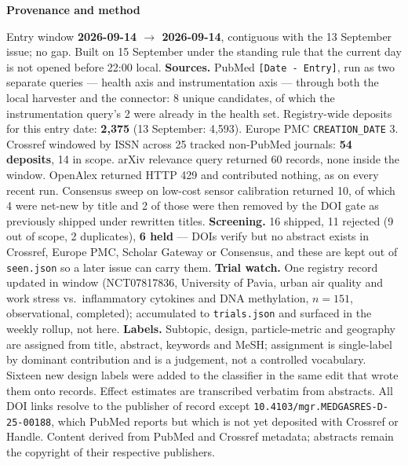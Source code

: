\documentclass[10pt]{article}
\begin{document}
\vspace{4mm}
\begin{keybox}
{\sffamily\bfseries\footnotesize\color{Deep}Provenance and method}\\[1.2mm]
{\fontsize{7.2}{8.8}\selectfont
Entry window \textbf{2026-09-14 $\to$ 2026-09-14}, contiguous with the 13 September issue;
no gap. Built on 15 September under the standing rule that the current day is not opened
before 22:00 local.
\textbf{Sources.} PubMed \texttt{[Date - Entry]}, run as two separate queries --- health
axis and instrumentation axis --- through both the local harvester and the connector:
8 unique candidates, of which the instrumentation query's 2 were already in the health
set. Registry-wide deposits for this entry date: \textbf{2{,}375} (13 September: 4{,}593).
Europe PMC \texttt{CREATION\_DATE} 3. Crossref windowed by ISSN across 25 tracked
non-PubMed journals: \textbf{54 deposits}, 14 in scope. arXiv relevance query returned
60 records, none inside the window. OpenAlex returned HTTP 429 and contributed nothing,
as on every recent run. Consensus sweep on low-cost sensor calibration returned 10,
of which 4 were net-new by title and 2 of those were then removed by the DOI gate as
previously shipped under rewritten titles.
\textbf{Screening.} 16 shipped, 11 rejected (9 out of scope, 2 duplicates), \textbf{6 held}
--- DOIs verify but no abstract exists in Crossref, Europe PMC, Scholar Gateway or
Consensus, and these are kept out of \texttt{seen.json} so a later issue can carry them.
\textbf{Trial watch.} One registry record updated in window (NCT07817836, University of
Pavia, urban air quality and work stress vs.\ inflammatory cytokines and DNA methylation,
$n=151$, observational, completed); accumulated to \texttt{trials.json} and surfaced in the
weekly rollup, not here.
\textbf{Labels.} Subtopic, design, particle-metric and geography are assigned from title,
abstract, keywords and MeSH; assignment is single-label by dominant contribution and is a
judgement, not a controlled vocabulary. Sixteen new design labels were added to the
classifier in the same edit that wrote them onto records.
Effect estimates are transcribed verbatim from abstracts. All DOI links resolve to the
publisher of record except \texttt{10.4103/mgr.MEDGASRES-D-25-00188}, which PubMed
reports but which is not yet deposited with Crossref or Handle.
Content derived from PubMed and Crossref metadata; abstracts remain the copyright of
their respective publishers.\par}
\end{keybox}
\end{document}
